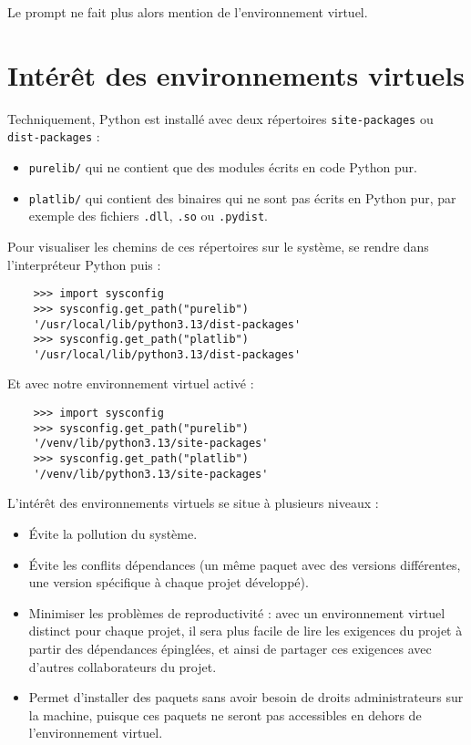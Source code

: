 Le prompt ne fait plus alors mention de l'environnement virtuel.

\section{Intérêt des environnements virtuels}
Techniquement, Python est installé avec deux répertoires \texttt{site-packages} ou \\
\texttt{dist-packages} :

\begin{itemize}
    \item \texttt{purelib/} qui ne contient que des modules écrits en code Python pur.
    \item \texttt{platlib/} qui contient des binaires qui ne sont pas écrits en Python pur, par exemple des fichiers \texttt{.dll}, \texttt{.so} ou \texttt{.pydist}.
\end{itemize}
\medskip

Pour visualiser les chemins de ces répertoires sur le système, se rendre dans l'interpréteur Python puis :
\begin{verbatim}
    >>> import sysconfig
    >>> sysconfig.get_path("purelib")
    '/usr/local/lib/python3.13/dist-packages'
    >>> sysconfig.get_path("platlib")
    '/usr/local/lib/python3.13/dist-packages'
\end{verbatim}

Et avec notre environnement virtuel activé :
\begin{verbatim}
    >>> import sysconfig
    >>> sysconfig.get_path("purelib")
    '/venv/lib/python3.13/site-packages'
    >>> sysconfig.get_path("platlib")
    '/venv/lib/python3.13/site-packages'
\end{verbatim}

L'intérêt des environnements virtuels se situe à plusieurs niveaux :

\begin{itemize}
    \item Évite la pollution du système.
    \item Évite les conflits dépendances (un même paquet avec des versions différentes, une version spécifique à chaque projet développé).
    \item Minimiser les problèmes de reproductivité : avec un environnement virtuel distinct pour chaque projet, il sera plus facile de lire les exigences du projet à partir des dépendances épinglées, et ainsi de partager ces exigences avec d'autres collaborateurs du projet.
    \item Permet d'installer des paquets sans avoir besoin de droits administrateurs sur la machine, puisque ces paquets ne seront pas accessibles en dehors de l'environnement virtuel.
\end{itemize}

